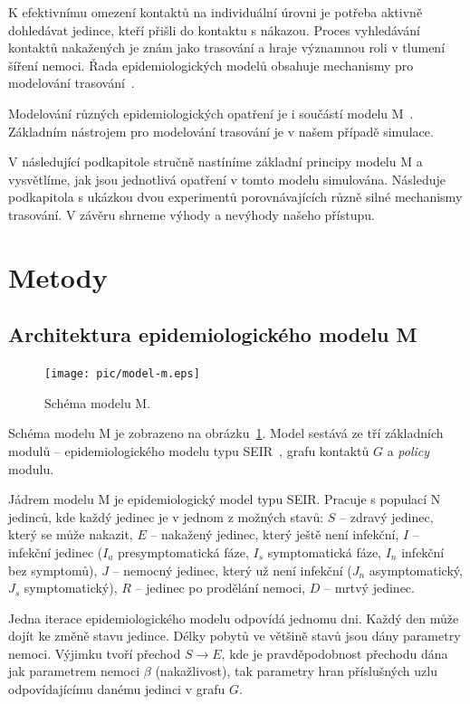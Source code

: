 K efektivnímu omezení kontaktů na individuální úrovni je potřeba
aktivně dohledávat jedince, kteří přišli do kontaktu s nákazou. Proces
vyhledávání kontaktů nakažených je znám jako trasování a hraje
významnou roli v tlumení šíření nemoci. Řada epidemiologických modelů
obsahuje mechanismy pro modelování
trasování~\cite{pg:mooney2020,pg:kucharski2020,pg:Kerr2020,pg:keeling2020,pg:bilinski2020}.

Modelování různých epidemiologických opatření je i součástí 
modelu M~\cite{pg:modelM}. Základním nástrojem pro modelování trasování je v našem případě simulace.

V následující podkapitole stručně nastíníme základní principy modelu M
a vysvětlíme, jak jsou jednotlivá opatření v tomto modelu
simulována. Následuje podkapitola s ukázkou dvou experimentů
porovnávajících různě silné mechanismy trasování. V závěru shrneme
výhody a nevýhody našeho přístupu.

\section*{Metody}

\subsection*{Architektura epidemiologického modelu M}

\begin{figure}[h]
  \centering
  \texttt{[image: pic/model-m.eps]}
  \caption{Schéma modelu M.}
  \label{pg:fig:mm}
\end{figure}

Schéma modelu M je zobrazeno na obrázku~\ref{pg:fig:mm}. Model sestává ze
tří základních modulů -- epidemiologického modelu typu
SEIR~\cite{pg:bailey1975}, grafu kontaktů $G$ a {\em policy} modulu.

Jádrem modelu M je epidemiologický model typu SEIR. Pracuje s populací N
jedinců, kde každý jedinec je v jednom z možných stavů: $S$ -- zdravý jedinec,
který se může nakazit, $E$ -- nakažený jedinec, který ještě není infekční, $I$ --
infekční jedinec ($I_a$ presymptomatická fáze, $I_s$ symptomatická fáze, $I_n$
infekční bez symptomů),  $J$ -- nemocný jedinec, který už není infekční ($J_n$
asymptomatický, $J_s$ symptomatický), $R$ -- jedinec po prodělání nemoci, $D$ --
mrtvý jedinec.

Jedna iterace epidemiologického modelu odpovídá jednomu dni. Každý den
může dojít ke změně stavu jedince.  Délky pobytů ve většině stavů jsou
dány parametry nemoci.  Výjimku tvoří přechod $S \rightarrow E$, kde
je pravděpodobnost přechodu dána jak parametrem nemoci $\beta$
(nakažlivost), tak parametry hran příslušných uzlu odpovídajícímu
danému jedinci v grafu $G$.


